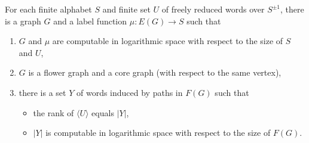 \documentclass{elsarticlenonatbib}
\newcommand{\gen}[1]{\langle #1 \rangle}
\newcommand{\Spm}{S^{\pm1}}
\begin{document}
\begin{lemma}\label{lem:main}
  For each finite alphabet $S$ and finite set $U$ of freely reduced words over $\Spm$, there is a graph $G$ and a label function $\mu \colon E(G) \to S$ such that
  \begin{enumerate}
  \item $G$ and $\mu$ are computable in logarithmic space with respect to the size of $S$ and $U$,
  \item $G$ is a flower graph and a core graph (with respect to the same vertex),
  \item there is a set $Y$ of words induced by paths in $F(G)$ such that
    \begin{itemize}
    \item the rank of $\gen{U}$ equals $|Y|$,
    \item $|Y|$ is computable in logarithmic space with respect to the size of $F(G)$.
    \end{itemize}
  \end{enumerate}
\end{lemma}
\end{document}
